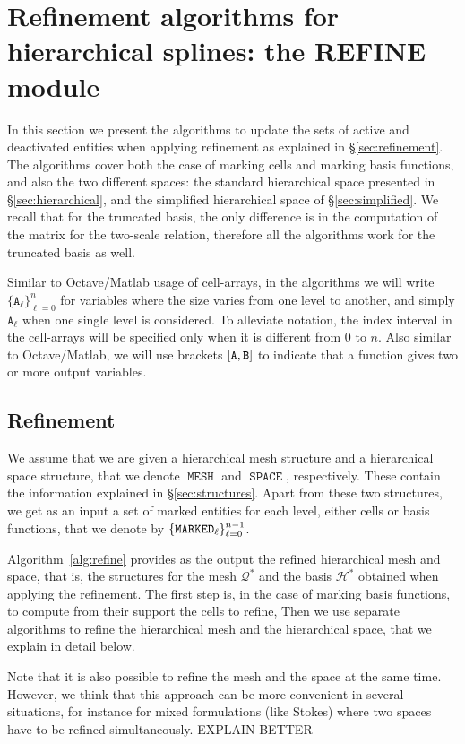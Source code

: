 \documentclass[a4paper]{siamltex1213}
\newcommand{\Rd}{\color{red}}
\DeclareMathOperator\mesh{\texttt{MESH}}
\DeclareMathOperator\basis{\texttt{SPACE}}
\DeclareMathOperator\marked{\tt MARKED}
\newcommand\QQ{\mathcal Q}
\newcommand\HH{\mathcal H}
\begin{document}
\section{Refinement algorithms for hierarchical splines: the REFINE module} \label{sec:REFINE}

In this section we present the algorithms to update the sets of active and deactivated entities when applying refinement as explained in \S\ref{sec:refinement}. The algorithms cover both the case of marking cells and marking basis functions, and also the two different spaces: the standard hierarchical space presented in \S\ref{sec:hierarchical}, and the {\Rd simplified} hierarchical space of \S\ref{sec:simplified}. We recall that for the truncated basis, the only difference is in the computation of the matrix for the two-scale relation, therefore all the algorithms work for the truncated basis as well.

Similar to Octave/Matlab usage of cell-arrays, in the algorithms we will write  $\{ \texttt{A}_\ell \}_{\ell=0}^n$ for variables where the size varies from one level to another, and simply $\texttt{A}_\ell$ when one single level is considered. To alleviate notation, the index interval in the cell-arrays will be specified only when it is different from 0 to $n$. Also similar to Octave/Matlab, we will use brackets $[\tt{A},{\tt B}]$ to indicate that a function gives two or more output variables.

\subsection{Refinement}
We assume that we are given a hierarchical mesh structure and a hierarchical space structure, that we denote $\mesh$ and $\basis$, respectively. These contain the information explained in \S\ref{sec:structures}. Apart from these two structures, we get as an input a set of marked entities for each level, either cells or basis functions, that we denote by $\{\marked_\ell\}_{\ell=0}^{n-1}$.

Algorithm~\ref{alg:refine} provides as the output the refined hierarchical mesh and space, that is, the structures for the mesh $\QQ^*$ and the basis $\HH^*$ obtained when applying the refinement. The first step is, in the case of marking basis functions, to compute from their support the cells to refine, Then we use separate algorithms to refine the hierarchical mesh and the hierarchical space, that we explain in detail below. 

Note that it is also possible to refine the mesh and the space at the same time. However, we think that this approach can be more convenient in several situations, for instance for mixed formulations (like Stokes) where two spaces have to be refined simultaneously. {\Rd EXPLAIN BETTER}
\end{document}

